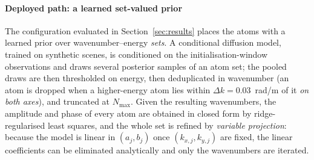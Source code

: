\documentclass[review]{elsarticle}
\begin{document}
\paragraph{Deployed path: a learned set-valued prior}
The configuration evaluated in Section~\ref{sec:results} places the atoms with a
learned prior over wavenumber--energy \emph{sets}. A conditional diffusion model,
trained on synthetic scenes, is conditioned on the initialisation-window
observations and draws several posterior samples of an atom set; the pooled draws
are then thresholded on energy, then deduplicated in wavenumber (an atom is dropped when a
higher-energy atom lies within $\Delta k = 0.03$~rad/m of it \emph{on both axes}),
and truncated at $N_{\max}$. Given the resulting
wavenumbers, the amplitude and phase of every atom are obtained in closed form by
ridge-regularised least squares, and the whole set is refined by \emph{variable
projection}: because the model is linear in $(a_j, b_j)$ once $(k_{x,j}, k_{y,j})$
are fixed, the linear coefficients can be eliminated analytically and only the
wavenumbers are iterated.
\end{document}
